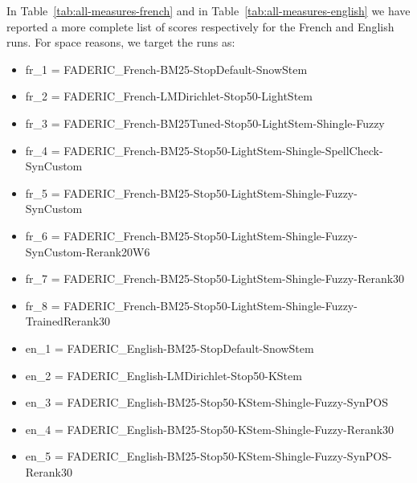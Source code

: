 \FloatBarrier

In Table~\ref{tab:all-measures-french} and in Table~\ref{tab:all-measures-english} we have reported a more complete list of scores respectively for the French and English runs. For space reasons, we target the runs as: 

\begin{itemize}
	\item fr\_1 = FADERIC\_French-BM25-StopDefault-SnowStem
	\item fr\_2 = FADERIC\_French-LMDirichlet-Stop50-LightStem
	\item fr\_3 = FADERIC\_French-BM25Tuned-Stop50-LightStem-Shingle-Fuzzy
	\item fr\_4 = FADERIC\_French-BM25-Stop50-LightStem-Shingle-SpellCheck-SynCustom
	\item fr\_5 = FADERIC\_French-BM25-Stop50-LightStem-Shingle-Fuzzy-SynCustom
	\item fr\_6 = FADERIC\_French-BM25-Stop50-LightStem-Shingle-Fuzzy-SynCustom-Rerank20W6
	\item fr\_7 = FADERIC\_French-BM25-Stop50-LightStem-Shingle-Fuzzy-Rerank30
	\item fr\_8 = FADERIC\_French-BM25-Stop50-LightStem-Shingle-Fuzzy-TrainedRerank30
	\item en\_1 = FADERIC\_English-BM25-StopDefault-SnowStem
	\item en\_2 = FADERIC\_English-LMDirichlet-Stop50-KStem
	\item en\_3 = FADERIC\_English-BM25-Stop50-KStem-Shingle-Fuzzy-SynPOS
	\item en\_4 = FADERIC\_English-BM25-Stop50-KStem-Shingle-Fuzzy-Rerank30
	\item en\_5 = FADERIC\_English-BM25-Stop50-KStem-Shingle-Fuzzy-SynPOS-Rerank30
\end{itemize}


